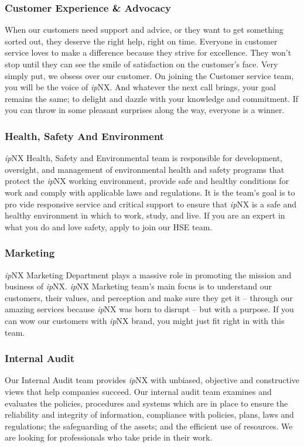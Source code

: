 \subsubsection{Customer Experience \& Advocacy}
When our customers need support and advice, or they want to get something sorted out, they deserve the right help, right on time. Everyone in customer service loves to make a difference because they strive for excellence. They won’t stop until they can see the smile of satisfaction on the customer’s face. Very simply put, we obsess over our customer. On joining the Customer service team, you will be the voice of \textit{ip}NX. And whatever the next call brings, your goal remains the same; to delight and dazzle with your knowledge and commitment. If you can throw in some pleasant surprises along the way, everyone is a winner.
\subsubsection{Health, Safety And Environment}
\textit{ip}NX Health, Safety and Environmental team is responsible for development, oversight, and management of environmental health and safety programs that protect the \textit{ip}NX working environment, provide safe and healthy conditions for work and comply with applicable laws and regulations. It is the team's goal is to pro vide responsive service and critical support to ensure that \textit{ip}NX is a safe and healthy environment in which to work, study, and live. If you are an expert in what you do and love safety, apply to join our HSE team.
\subsubsection{Marketing}
\textit{ip}NX Marketing Department plays a massive role in promoting the mission and business of \textit{ip}NX. \textit{ip}NX Marketing team's main focus is to understand our customers, their values, and perception and make sure they get it – through our amazing services because \textit{ip}NX was born to disrupt – but with a purpose.  If you can wow our customers with \textit{ip}NX brand, you might just fit right in with this team.
\subsubsection{Internal Audit}
Our Internal Audit team provides \textit{ip}NX with unbiased, objective and constructive views that help companies succeed. Our internal audit team examines and evaluates the policies, procedures and systems which are in place to ensure the reliability and integrity of information, compliance with policies, plans, laws and regulations; the safeguarding of the assets; and the efficient use of resources. We are looking for professionals who take pride in their work.
